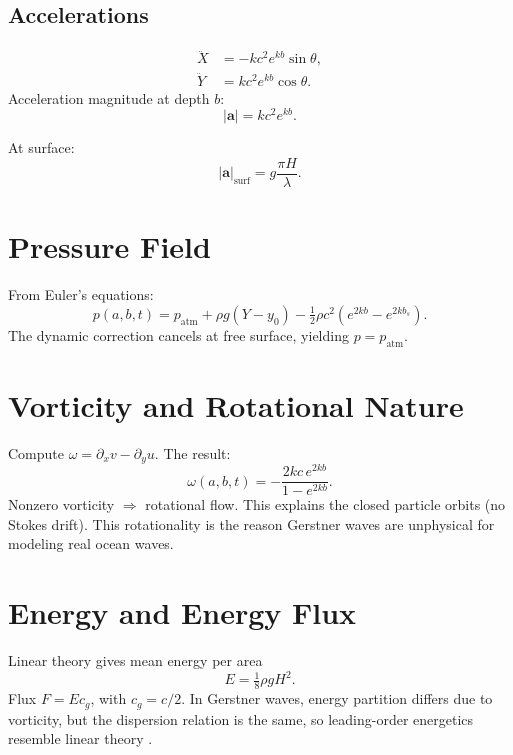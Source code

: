 \documentclass[11pt]{article}
\begin{document}
\subsection{Accelerations}
\begin{align}
\ddot X &= -kc^2 e^{kb}\sin\theta, \\
\ddot Y &= kc^2 e^{kb}\cos\theta.
\end{align}
Acceleration magnitude at depth $b$:
\begin{equation}
|\mathbf{a}| = kc^2 e^{kb}.
\end{equation}

At surface:
\begin{equation}
|\mathbf{a}|_{\text{surf}} = g\frac{\pi H}{\lambda}.
\end{equation}

\section{Pressure Field}
From Euler’s equations:
\begin{equation}
p(a,b,t) = p_{\text{atm}} + \rho g (Y-y_0) - \tfrac{1}{2}\rho c^2 (e^{2kb}-e^{2kb_s}).
\end{equation}
The dynamic correction cancels at free surface, yielding $p=p_{\text{atm}}$.

\section{Vorticity and Rotational Nature}
Compute $\omega=\partial_x v - \partial_y u$. The result:
\begin{equation}
\omega(a,b,t) = -\frac{2kc\,e^{2kb}}{1-e^{2kb}}.
\end{equation}
Nonzero vorticity $\Rightarrow$ rotational flow. This explains the closed particle orbits (no Stokes drift). This rotationality is the reason Gerstner waves are unphysical for modeling real ocean waves.

\section{Energy and Energy Flux}
Linear theory gives mean energy per area
\begin{equation}
E = \tfrac{1}{8}\rho g H^2.
\end{equation}
Flux $F=E c_g$, with $c_g=c/2$. In Gerstner waves, energy partition differs due to vorticity, but the dispersion relation is the same, so leading-order energetics resemble linear theory \cite{mei1989applied}.
\end{document}
